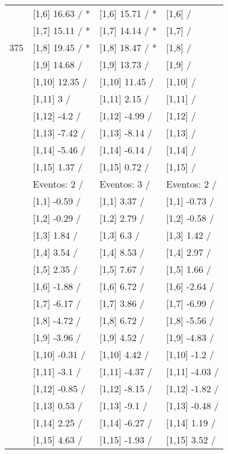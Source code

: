 \begin{table}
\begin{tabular}[t]{llll}
 & {}[1,6] 16.63  / * & {}[1,6] 15.71  / * & {}[1,6]  /\\
 & {}[1,7] 15.11  / * & {}[1,7] 14.14  / * & {}[1,7]  /\\
375 & {}[1,8] 19.45  / * & {}[1,8] 18.47  / * & {}[1,8]  /\\
\addlinespace
 & {}[1,9] 14.68  / & {}[1,9] 13.73  / & {}[1,9]  /\\
 & {}[1,10] 12.35  / & {}[1,10] 11.45  / & {}[1,10]  /\\
 & {}[1,11] 3  / & {}[1,11] 2.15  / & {}[1,11]  /\\
 & {}[1,12] -4.2  / & {}[1,12] -4.99  / & {}[1,12]  /\\
 & {}[1,13] -7.42  / & {}[1,13] -8.14  / & {}[1,13]  /\\
\addlinespace
 & {}[1,14] -5.46  / & {}[1,14] -6.14  / & {}[1,14]  /\\
 & {}[1,15] 1.37  / & {}[1,15] 0.72  / & {}[1,15]  /\\
 & Eventos:  2 / & Eventos:  3 / & Eventos:  2 /\\
 & {}[1,1] -0.59  / & {}[1,1] 3.37  / & {}[1,1] -0.73  /\\
 & {}[1,2] -0.29  / & {}[1,2] 2.79  / & {}[1,2] -0.58  /\\
\addlinespace
 & {}[1,3] 1.84  / & {}[1,3] 6.3  / & {}[1,3] 1.42  /\\
 & {}[1,4] 3.54  / & {}[1,4] 8.53  / & {}[1,4] 2.97  /\\
 & {}[1,5] 2.35  / & {}[1,5] 7.67  / & {}[1,5] 1.66  /\\
 & {}[1,6] -1.88  / & {}[1,6] 6.72  / & {}[1,6] -2.64  /\\
 & {}[1,7] -6.17  / & {}[1,7] 3.86  / & {}[1,7] -6.99  /\\
\addlinespace
500 & {}[1,8] -4.72  / & {}[1,8] 6.72  / & {}[1,8] -5.56  /\\
 & {}[1,9] -3.96  / & {}[1,9] 4.52  / & {}[1,9] -4.83  /\\
 & {}[1,10] -0.31  / & {}[1,10] 4.42  / & {}[1,10] -1.2  /\\
 & {}[1,11] -3.1  / & {}[1,11] -4.37  / & {}[1,11] -4.03  /\\
 & {}[1,12] -0.85  / & {}[1,12] -8.15  / & {}[1,12] -1.82  /\\
\addlinespace
 & {}[1,13] 0.53  / & {}[1,13] -9.1  / & {}[1,13] -0.48  /\\
 & {}[1,14] 2.25  / & {}[1,14] -6.27  / & {}[1,14] 1.19  /\\
 & {}[1,15] 4.63  / & {}[1,15] -1.93  / & {}[1,15] 3.52  /\\
\bottomrule
\end{tabular}
\end{table}
